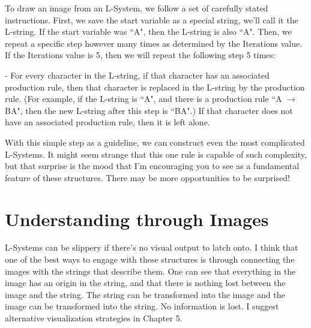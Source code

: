 \documentclass[12pt,twoside]{reedthesis}
\begin{document}
	To draw an image from an L-System, we follow a set of carefully stated instructions. First, we save the start variable as a special string, we'll call it the L-string. If the start variable was ``A", then the L-string is also ``A". Then, we repeat a specific step however many times as determined by the Iterations value. If the Iterations value is 5, then we will repeat the following step 5 times:\\
	
	\begin{addmargin}[4em]{4em}
	- For every character in the L-string, if that character has an associated production rule, then that character is replaced in the L-string by the production rule. (For example, if the L-string is ``A", and there is a production rule ``A $\rightarrow$ BA", then the new L-string after this step is ``BA".) If that character does not have an associated production rule, then it is left alone.\\
	 \end{addmargin}
	 
	 With this simple step as a guideline, we can construct even the most complicated L-Systems. It might seem strange that this one rule is capable of such complexity, but that surprise is the mood that I'm encouraging you to see as a fundamental feature of these structures. There may be more opportunities to be surprised!


\section{Understanding through Images}

	L-Systems can be slippery if there's no visual output to latch onto. I think that one of the best ways to engage with these structures is through connecting the images with the strings that describe them. One can see that everything in the image has an origin in the string, and that there is nothing lost between the image and the string. The string can be transformed into the image and the image can be transformed into the string. No information is lost. I suggest alternative visualization strategies in Chapter 5.
	
\end{document}
